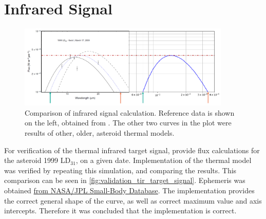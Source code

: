 \section{Infrared Signal}
\label{sec:vvinfrared}

\begin{figure}[htbp]
 \centering
 \includegraphics[width=0.9\textwidth]{img/validation_tir_target_signal.png}
 \caption{Comparison of infrared signal calculation. Reference data is shown on the left, obtained from \cite{AsteroidNEATM}. The other two curves in the plot were results of other, older, asteroid thermal models.}
 \label{fig:validation_tir_target_signal}
\end{figure}

For verification of the thermal infrared target signal, \cite{AsteroidNEATM} provide flux calculations for the asteroid 1999 LD$_{31}$, on a given date. Implementation of the thermal model was verified by repeating this simulation, and comparing the results. This comparison can be seen in \autoref{fig:validation_tir_target_signal}. Ephemeris was obtained \href{https://ssd.jpl.nasa.gov/tools/sbdb\_lookup.html#/?sstr=1999\%20LD31}{from NASA/JPL Small-Body Database}. The implementation provides the correct general shape of the curve, as well as correct maximum value and axis intercepts. Therefore it was concluded that the implementation is correct.\\

